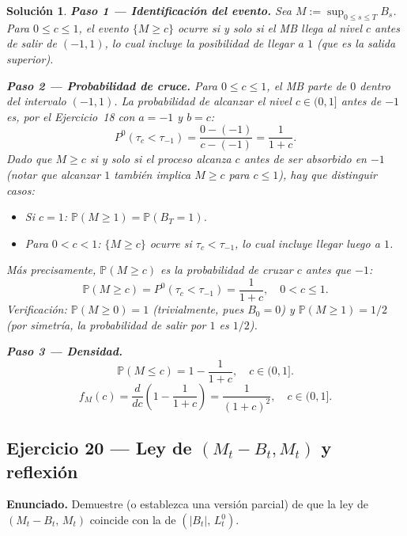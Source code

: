 \documentclass[12pt,letterpaper]{article}
\theoremstyle{ejercicio}
\theoremstyle{solucion}
\newtheorem*{solucion}{Solución}
\renewcommand{\P}{\mathbb{P}}
\begin{document}
\begin{solucion}

\textbf{Paso 1 — Identificación del evento.}
Sea $M:=\sup_{0\le s\le T}B_s$. Para $0\le c\le 1$, el evento $\{M\ge c\}$ ocurre si y solo si
el MB llega al nivel $c$ antes de salir de $(-1,1)$, lo cual incluye la posibilidad de llegar
a $1$ (que es la salida superior).

\textbf{Paso 2 — Probabilidad de cruce.}
Para $0\le c\le 1$, el MB parte de $0$ dentro del intervalo $(-1,1)$.
La probabilidad de alcanzar el nivel $c\in(0,1]$ antes de $-1$ es, por el Ejercicio~18
con $a=-1$ y $b=c$:
\[
  P^0(\tau_c<\tau_{-1}) = \frac{0-(-1)}{c-(-1)} = \frac{1}{1+c}.
\]
Dado que $M\ge c$ si y solo si el proceso alcanza $c$ antes de ser absorbido en $-1$
(notar que alcanzar $1$ también implica $M\ge c$ para $c\le 1$), hay que distinguir casos:

\begin{itemize}
  \item Si $c=1$: $\P(M\ge 1)=\P(B_T=1)$.
  \item Para $0<c<1$: $\{M\ge c\}$ ocurre si $\tau_c<\tau_{-1}$, lo cual incluye
        llegar luego a $1$.
\end{itemize}
Más precisamente, $\P(M\ge c)$ es la probabilidad de cruzar $c$ antes que $-1$:
\[
  \P(M\ge c) = P^0(\tau_c<\tau_{-1}) = \frac{1}{1+c},\quad 0<c\le 1.
\]
Verificación: $\P(M\ge 0)=1$ (trivialmente, pues $B_0=0$) y $\P(M\ge 1)=1/2$ (por simetría,
la probabilidad de salir por $1$ es $1/2$).

\textbf{Paso 3 — Densidad.}
\[
  \P(M\le c) = 1 - \frac{1}{1+c},\quad c\in(0,1].
\]
\[
  f_M(c) = \frac{d}{dc}\left(1-\frac{1}{1+c}\right) = \frac{1}{(1+c)^2},\quad c\in(0,1].
\]
\end{solucion}

\subsection*{Ejercicio 20 — Ley de $(M_t-B_t, M_t)$ y reflexión}

\begin{recuadro}
\textbf{Enunciado.} Demuestre (o establezca una versión parcial) de que la ley de
$(M_t-B_t,\,M_t)$ coincide con la de $(|B_t|,\,L^0_t)$.
\end{recuadro}
\end{document}
